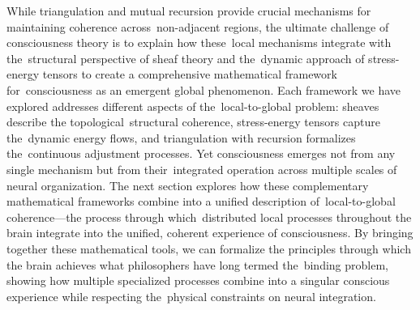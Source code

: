 While triangulation and mutual recursion provide crucial mechanisms for maintaining coherence across~non-adjacent regions, the ultimate challenge of consciousness theory is to explain how these~local mechanisms integrate with the~structural perspective of sheaf theory and the~dynamic approach of stress-energy tensors to create a comprehensive mathematical framework for~consciousness as an emergent global phenomenon. Each framework we have explored addresses different aspects of the~local-to-global problem: sheaves describe the topological~structural coherence, stress-energy tensors capture the~dynamic energy flows, and triangulation with recursion formalizes the~continuous adjustment processes. Yet consciousness emerges not from any single mechanism but from their~integrated operation across multiple scales of neural organization. The next section explores how these complementary mathematical frameworks combine into a unified description of~local-to-global coherence—the process through which~distributed local processes throughout the brain integrate into the unified, coherent experience of consciousness. By bringing together these mathematical tools, we can formalize the principles through which the brain achieves what philosophers have long termed the~binding problem, showing how multiple specialized processes combine into a singular conscious experience while respecting the~physical constraints on neural integration.
